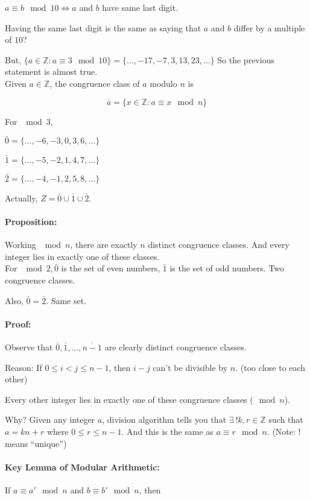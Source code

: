 \documentclass[a4paper, 11pt, twoside]{article}
\begin{document}
$a\equiv b \mod 10 \iff a$ and $b$ have same last digit. 

Having the same last digit is the same as saying that $a$ and $b$ differ by a multiple of $10$?

But, $\{a\in\mathbb{Z}: a\equiv 3\mod 10\}=\{\dots, -17, -7, 3, 13, 23, \dots\}$ So the previous statement is almost true.\\

Given $a\in\mathbb{Z}$, the congruence class of $a$ modulo $n$ is 

\[\bar{a}=\{x\in\mathbb{Z}: a\equiv x \mod n\}\]

For $\mod 3$, 

$\bar{0}=\{\dots, -6, -3, 0, 3, 6, \dots\}$

$\bar{1}=\{\dots, -5, -2, 1, 4, 7, \dots\}$

$\bar{2}=\{\dots, -4, -1, 2, 5, 8, \dots\}$

Actually, $Z=\bar{0}\cup\bar{1}\cup\bar{2}.$\\

\paragraph{Proposition:} Working $\mod n$, there are exactly $n$ distinct congruence classes. And every integer lies in exactly one of these classes.\\

For $\mod 2, \bar{0}$ is the set of even numbers, $\bar{1}$ is the set of odd numbers. Two congruence classes.

Also, $\bar{0}=\bar{2}$. Same set.

\paragraph{Proof:} Observe that $\bar{0}, \bar{1}, \dots, \overline{n-1}$ are clearly distinct congruence classes.

Reason: If $0\leq i < j\leq n-1$, then $i-j$ can't be divisible by $n$. (too close to each other)

Every other integer lies in exactly one of these congruence classes ($\mod n$).

Why? Given any integer $a$, division algorithm tells you that $\exists\ !k, r\in\mathbb{Z}$ such that $a=kn+r$ where $0\leq r\leq n-1.$ And this is the same as $a\equiv r\mod n$. (Note: ! means ``unique'')

\paragraph{Key Lemma of Modular Arithmetic:} If $a\equiv a' \mod n$ and $b\equiv b' \mod n$, then
\end{document}
